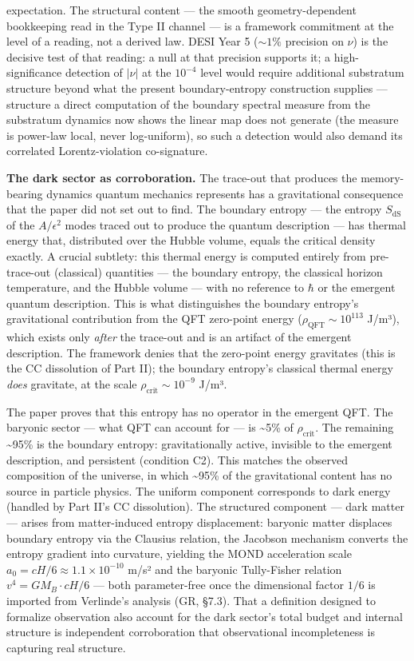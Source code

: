 \documentclass[
]{article}
\begin{document}
expectation. The structural content --- the smooth geometry-dependent
bookkeeping read in the Type II channel --- is a framework commitment at
the level of a reading, not a derived law. DESI Year 5 (\(\sim 1\%\)
precision on \(\nu\)) is the decisive test of that reading: a null at
that precision supports it; a high-significance detection of \(|\nu|\)
at the \(10^{-4}\) level would require additional substratum structure
beyond what the present boundary-entropy construction supplies ---
structure a direct computation of the boundary spectral measure from the
substratum dynamics now shows the linear map does not generate (the
measure is power-law local, never log-uniform), so such a detection
would also demand its correlated Lorentz-violation co-signature.

\textbf{The dark sector as corroboration.} The trace-out that produces
the memory-bearing dynamics quantum mechanics represents has a
gravitational consequence that the paper did not set out to find. The
boundary entropy --- the entropy \(S_{\text{dS}}\) of the
\(A/\epsilon^2\) modes traced out to produce the quantum description ---
has thermal energy that, distributed over the Hubble volume, equals the
critical density exactly. A crucial subtlety: this thermal energy is
computed entirely from pre-trace-out (classical) quantities --- the
boundary entropy, the classical horizon temperature, and the Hubble
volume --- with no reference to \(\hbar\) or the emergent quantum
description. This is what distinguishes the boundary entropy's
gravitational contribution from the QFT zero-point energy
(\(\rho_{\text{QFT}} \sim 10^{113}\) J/m³), which exists only
\emph{after} the trace-out and is an artifact of the emergent
description. The framework denies that the zero-point energy gravitates
(this is the CC dissolution of Part II); the boundary entropy's
classical thermal energy \emph{does} gravitate, at the scale
\(\rho_{\text{crit}} \sim 10^{-9}\) J/m³.

The paper proves that this entropy has no operator in the emergent QFT.
The baryonic sector --- what QFT can account for --- is
\textasciitilde5\% of \(\rho_{\text{crit}}\). The remaining
\textasciitilde95\% is the boundary entropy: gravitationally active,
invisible to the emergent description, and persistent (condition C2).
This matches the observed composition of the universe, in which
\textasciitilde95\% of the gravitational content has no source in
particle physics. The uniform component corresponds to dark energy
(handled by Part II's CC dissolution). The structured component --- dark
matter --- arises from matter-induced entropy displacement: baryonic
matter displaces boundary entropy via the Clausius relation, the
Jacobson mechanism converts the entropy gradient into curvature,
yielding the MOND acceleration scale
\(a_0 = cH/6 \approx 1.1 \times 10^{-10}\) m/s² and the baryonic
Tully-Fisher relation \(v^4 = GM_B \cdot cH/6\) --- both parameter-free
once the dimensional factor \(1/6\) is imported from Verlinde's analysis
(GR, §7.3). That a definition designed to formalize observation also
account for the dark sector's total budget and internal structure is
independent corroboration that observational incompleteness is capturing
real structure.
\end{document}

